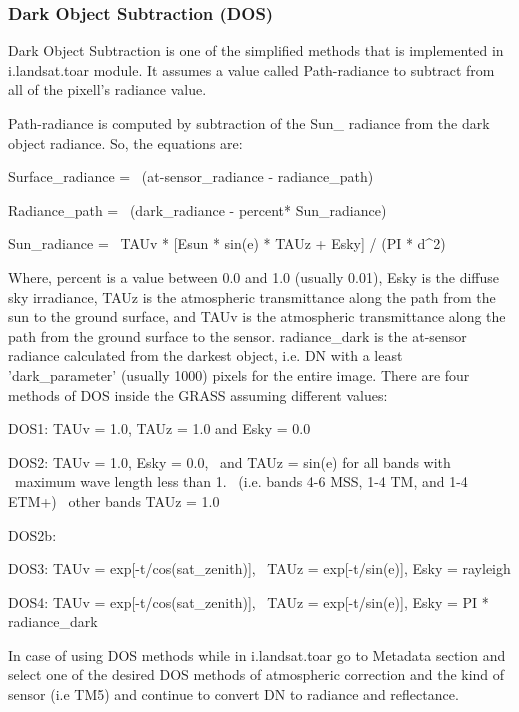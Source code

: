 \subsubsection{Dark Object Subtraction (DOS)}
Dark Object Subtraction is one of the simplified methods that is implemented in i.landsat.toar module. It assumes a value called Path-radiance to subtract from all of the pixell's radiance value. \newline

Path-radiance is computed  by subtraction of the Sun\_ radiance from the dark object radiance. So, the equations are:\newline

\begin{smallverbatim}
Surface_radiance = \
 (at-sensor_radiance - radiance_path)

Radiance_path = \
 (dark_radiance - percent* Sun_radiance)   

Sun_radiance = \
 TAUv * [Esun * sin(e) * TAUz + Esky] / (PI * d^2) 
\end{smallverbatim}

Where, percent is a value between 0.0 and 1.0 (usually 0.01), Esky is the diffuse sky irradiance, TAUz is the atmospheric transmittance along the path from the sun to the ground surface, and TAUv is the atmospheric transmittance along the path from the ground surface to the sensor. radiance\_dark is the at-sensor radiance calculated from the darkest object, i.e. DN with a least 'dark\_parameter' (usually 1000) pixels for the entire image. There are four methods of DOS inside the GRASS assuming different values:\newline

\begin{smallverbatim}
DOS1: TAUv = 1.0, TAUz = 1.0 and Esky = 0.0 

DOS2: TAUv = 1.0, Esky = 0.0, \
 and TAUz = sin(e) for all bands with \
 maximum wave length less than 1. \
 (i.e. bands 4-6 MSS, 1-4 TM, and 1-4 ETM+) \
 other bands TAUz = 1.0
 
DOS2b: 

DOS3: TAUv = exp[-t/cos(sat_zenith)], \
 TAUz = exp[-t/sin(e)], Esky = rayleigh
 
DOS4: TAUv = exp[-t/cos(sat_zenith)], \
 TAUz = exp[-t/sin(e)], Esky = PI * radiance_dark  
\end{smallverbatim}

In case of using DOS methods while in i.landsat.toar go to Metadata section and select one of the desired DOS methods of atmospheric correction and the kind of sensor (i.e TM5) and continue  to  convert DN to radiance and reflectance. \newline

